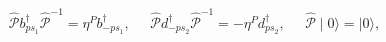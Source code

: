 \begin{equation}
\widehat{\mathcal{P}}b_{ps_{1}}^{\dagger }\widehat{\mathcal{P}}^{-1}=\eta
^{P}b_{-ps_{1}}^{\dagger },\;\;\;\;\;\widehat{\mathcal{P}}%
d_{-ps_{2}}^{\dagger }\widehat{\mathcal{P}}^{-1}=-\eta
^{P}d_{ps_{2}}^{\dagger },\;\;\;\;\;\widehat{\mathcal{P}}\mid 0\rangle =\mid
0\rangle ,
\end{equation}

